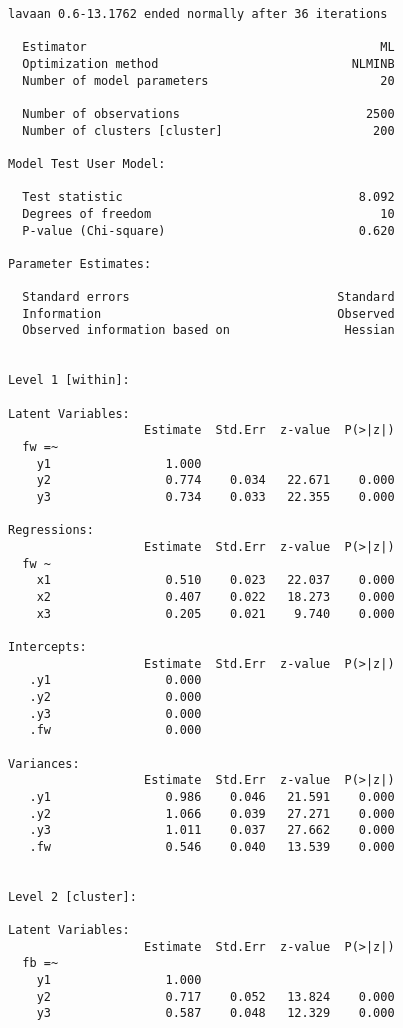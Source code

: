 \begin{verbatim}
lavaan 0.6-13.1762 ended normally after 36 iterations

  Estimator                                         ML
  Optimization method                           NLMINB
  Number of model parameters                        20

  Number of observations                          2500
  Number of clusters [cluster]                     200

Model Test User Model:
                                                      
  Test statistic                                 8.092
  Degrees of freedom                                10
  P-value (Chi-square)                           0.620

Parameter Estimates:

  Standard errors                             Standard
  Information                                 Observed
  Observed information based on                Hessian


Level 1 [within]:

Latent Variables:
                   Estimate  Std.Err  z-value  P(>|z|)
  fw =~                                               
    y1                1.000                           
    y2                0.774    0.034   22.671    0.000
    y3                0.734    0.033   22.355    0.000

Regressions:
                   Estimate  Std.Err  z-value  P(>|z|)
  fw ~                                                
    x1                0.510    0.023   22.037    0.000
    x2                0.407    0.022   18.273    0.000
    x3                0.205    0.021    9.740    0.000

Intercepts:
                   Estimate  Std.Err  z-value  P(>|z|)
   .y1                0.000                           
   .y2                0.000                           
   .y3                0.000                           
   .fw                0.000                           

Variances:
                   Estimate  Std.Err  z-value  P(>|z|)
   .y1                0.986    0.046   21.591    0.000
   .y2                1.066    0.039   27.271    0.000
   .y3                1.011    0.037   27.662    0.000
   .fw                0.546    0.040   13.539    0.000


Level 2 [cluster]:

Latent Variables:
                   Estimate  Std.Err  z-value  P(>|z|)
  fb =~                                               
    y1                1.000                           
    y2                0.717    0.052   13.824    0.000
    y3                0.587    0.048   12.329    0.000


\end{verbatim}
